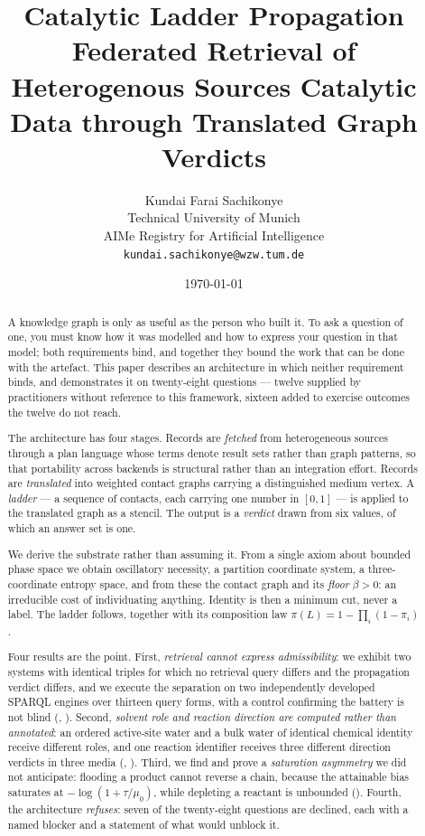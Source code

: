 \documentclass[11pt,twocolumn,a4paper]{article}
\title{\textbf{Catalytic Ladder Propagation}\\[4pt]
\large Federated Retrieval of Heterogenous Sources Catalytic Data through Translated Graph Verdicts }
\author{Kundai Farai Sachikonye\\
\small Technical University of Munich\\
\small AIMe Registry for Artificial Intelligence\\
\small \texttt{kundai.sachikonye@wzw.tum.de}}
\date{\today}
\theoremstyle{thmstyle}
\theoremstyle{definition}
\theoremstyle{remark}
\newcommand{\flo}{\beta}
\newcommand{\pow}{\pi}
\newcommand{\Lad}{L}
\begin{document}
\maketitle

\begin{abstract}
\noindent
A knowledge graph is only as useful as the person who built it. To ask a
question of one, you must know how it was modelled and how to express your
question in that model; both requirements bind, and together they bound the
work that can be done with the artefact. This paper describes an architecture
in which neither requirement binds, and demonstrates it on twenty-eight
questions --- twelve supplied by practitioners without reference to this
framework, sixteen added to exercise outcomes the twelve do not reach.

The architecture has four stages. Records are \emph{fetched} from
heterogeneous sources through a plan language whose terms denote result sets
rather than graph patterns, so that portability across backends is structural
rather than an integration effort. Records are \emph{translated} into weighted
contact graphs carrying a distinguished medium vertex. A \emph{ladder} --- a
sequence of contacts, each carrying one number in $[0,1]$ --- is applied to
the translated graph as a stencil. The output is a \emph{verdict} drawn from
six values, of which an answer set is one.

We derive the substrate rather than assuming it. From a single axiom about
bounded phase space we obtain oscillatory necessity, a partition coordinate
system, a three-coordinate entropy space, and from these the contact graph and
its \emph{floor} $\flo > 0$: an irreducible cost of individuating anything.
Identity is then a minimum cut, never a label. The ladder follows, together
with its composition law $\pow(\Lad) = 1 - \prod_i(1-\pow_i)$.

Four results are the point. First, \emph{retrieval cannot express
admissibility}: we exhibit two systems with identical triples for which no
retrieval query differs and the propagation verdict differs, and we execute
the separation on two independently developed SPARQL engines over thirteen
query forms, with a control confirming the battery is not blind
(, ). Second, \emph{solvent role and
reaction direction are computed rather than annotated}: an ordered active-site
water and a bulk water of identical chemical identity receive different roles,
and one reaction identifier receives three different direction verdicts in
three media (, ). Third, we find and prove
a \emph{saturation asymmetry} we did not anticipate: flooding a product cannot
reverse a chain, because the attainable bias saturates at
$-\log(1+\tau/\mu_0)$, while depleting a reactant is unbounded
(). Fourth, the architecture \emph{refuses}: seven of
the twenty-eight questions are declined, each with a named blocker and a
statement of what would unblock it.


\end{abstract}
\end{document}
